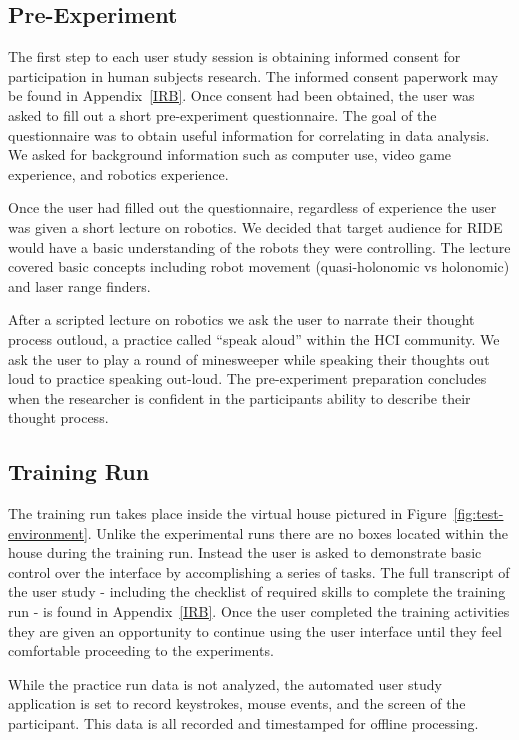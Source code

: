 \subsection{Pre-Experiment} %
\label{sub:pre_experiment}
The first step to each user study session is obtaining informed consent for participation in human subjects research. The informed consent paperwork may be found in Appendix~\ref{IRB}. Once consent had been obtained, the user was asked to fill out a short pre-experiment questionnaire. The goal of the questionnaire was to obtain useful information for correlating in data analysis. We asked for background information such as computer use, video game experience, and robotics experience.

Once the user had filled out the questionnaire, regardless of experience the user was given a short lecture on robotics. We decided that target audience for RIDE would have a basic understanding of the robots they were controlling. The lecture covered basic concepts including robot movement (quasi-holonomic  vs holonomic) and laser range finders.

After a scripted lecture on robotics we ask the user to narrate their thought process outloud, a practice called ``speak aloud'' within the HCI community. We ask the user to play a round of minesweeper while speaking their thoughts out loud to practice speaking out-loud. The pre-experiment preparation concludes when the researcher is confident in the participants ability to describe their thought process.

\subsection{Training Run} %
\label{sub:training_run}
The training run takes place inside the virtual house pictured in Figure~\ref{fig:test-environment}. Unlike the experimental runs there are no boxes located within the house during the training run. Instead the user is asked to demonstrate basic control over the interface by accomplishing a series of tasks. The full transcript of the user study - including the checklist of required skills to complete the training run - is found in Appendix~\ref{IRB}. Once the user completed the training activities they are given an opportunity to continue using the user interface until they feel comfortable proceeding to the experiments.

While the practice run data is not analyzed, the automated user study application is set to record keystrokes, mouse events, and the screen of the participant. This data is all recorded and timestamped for offline processing. 

